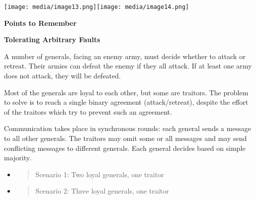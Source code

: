 \texttt{[image: media/image13.png]}\texttt{[image: media/image14.png]}

\protect\hypertarget{OLEux5fLINK2}{}{\protect\hypertarget{teil8}{}{}}\textbf{Points
to Remember}

\protect\hypertarget{oleux5flink2}{}{\protect\hypertarget{OLEux5fLINK2}{}{}}

\textbf{Tolerating Arbitrary Faults}

A number of generals, facing an enemy army, must decide whether to
attack or retreat. Their armies can defeat the enemy if they all attack.
If at least one army does not attack, they will be defeated.

Most of the generals are loyal to each other, but some are traitors. The
problem to solve is to reach a single binary agreement (attack/retreat),
despite the effort of the traitors which try to prevent such an
agreement.

Communication takes place in synchronous rounds: each general sends a
message to all other generals. The traitors may omit some or all
messages and may send conflicting messages to different generals. Each
general decides based on simple majority.

\begin{itemize}
\item
  \begin{quote}
  Scenario 1: Two loyal generals, one traitor
  \end{quote}
\item
  \begin{quote}
  Scenario 2: Three loyal generals, one traitor
  \end{quote}
\end{itemize}
